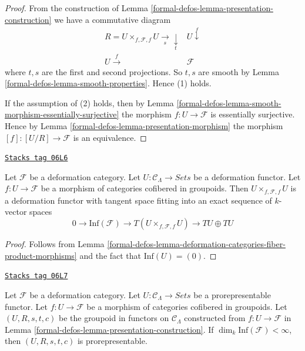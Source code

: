 \begin{proof}
From the construction of
Lemma \ref{formal-defos-lemma-presentation-construction}
we have a commutative diagram
$$
\begin{array}{cc}R = U \times_{f, \mathcal{F}, f} U \underset{s}{\longrightarrow}\underset{t}{\downarrow} & U
\overset{f}{\downarrow} \\ U \overset{f}{\longrightarrow} & \mathcal{F}\end{array}
$$
where $t, s$ are the first and second projections.  So $t, s$ are smooth by
Lemma \ref{formal-defos-lemma-smooth-properties}.  Hence (1) holds.

\medskip\noindent
If the assumption of (2) holds, then by
Lemma \ref{formal-defos-lemma-smooth-morphism-essentially-surjective}
the morphism $f : U \to \mathcal{F}$ is essentially surjective. Hence by
Lemma \ref{formal-defos-lemma-presentation-morphism}
the morphism $[f] : [U/R] \to \mathcal{F}$ is an equivalence.
\end{proof}

\begin{lemma}
\label{formal-defos-lemma-deformation-functor-diagonal}
\href{https://stacks.math.columbia.edu/tag/06L6}{\texttt{Stacks tag 06L6}}

Let $\mathcal{F}$ be a deformation category.
Let $U : \mathcal{C}_\Lambda \to \textit{Sets}$ be a deformation functor.
Let $f: U \to \mathcal{F}$ be a morphism of categories cofibered in groupoids.
Then $U \times_{f, \mathcal{F}, f} U$ is a deformation functor
with tangent space fitting into an exact sequence of $k$-vector spaces
$$
0 \to \text{Inf}(\mathcal{F}) \to
T(U \times_{f, \mathcal{F}, f} U) \to TU \oplus TU
$$
\end{lemma}

\begin{proof}
Follows from
Lemma \ref{formal-defos-lemma-deformation-categories-fiber-product-morphisms}
and the fact that $\text{Inf}(U) = (0)$.
\end{proof}

\begin{lemma}
\label{formal-defos-lemma-prorepresentable-groupoid-in-functors-construction}
\href{https://stacks.math.columbia.edu/tag/06L7}{\texttt{Stacks tag 06L7}}

Let $\mathcal{F}$ be a deformation category.
Let $U : \mathcal{C}_\Lambda \to \textit{Sets}$ be a prorepresentable functor.
Let $f : U \to \mathcal{F}$ be a morphism of categories cofibered in groupoids.
Let $(U, R, s, t, c)$ be the groupoid in functors on $\mathcal{C}_\Lambda$
constructed from $f : U \to \mathcal{F}$ in
Lemma \ref{formal-defos-lemma-presentation-construction}. If
$\dim_k \text{Inf}(\mathcal{F}) < \infty$, then
$(U, R, s, t, c)$ is prorepresentable.
\end{lemma}

